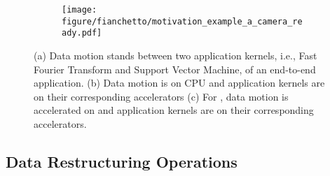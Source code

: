 \begin{figure}[ht!]
    \centering
    \begin{subfigure}[b]{\columnwidth}
    \texttt{[image: figure/fianchetto/motivation\_example\_a\_camera\_ready.pdf]}
    \caption{}
    \label{fig:motivation:example-a}
    \end{subfigure}
    \begin{subfigure}[b]{\columnwidth}
    \end{subfigure}
    \begin{subfigure}[b]{\columnwidth}
    \end{subfigure}
    \caption{ 
    (a) Data motion stands between two application kernels, i.e., Fast Fourier Transform and Support Vector Machine, of an end-to-end application.  
    (b) Data motion is on CPU and application kernels are on their corresponding accelerators 
    (c) For \dmx, data motion is accelerated on \drx and application kernels are on their corresponding accelerators.
    }
    \label{fig:motiv-ex}
    \vspace{-3ex}
\end{figure}

\subsection{Data Restructuring Operations}
\label{sec:motivation:operations}


